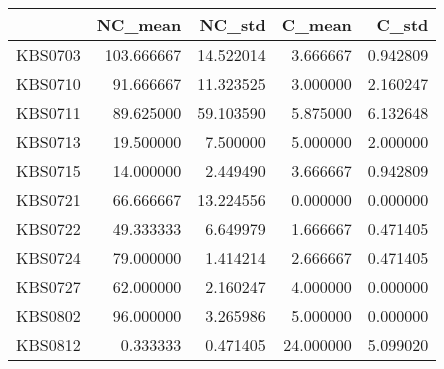 \begin{tabular}{lrrrr}
\toprule
{} &     NC\_mean &     NC\_std &     C\_mean &     C\_std \\
\midrule
KBS0703 &  103.666667 &  14.522014 &   3.666667 &  0.942809 \\
KBS0710 &   91.666667 &  11.323525 &   3.000000 &  2.160247 \\
KBS0711 &   89.625000 &  59.103590 &   5.875000 &  6.132648 \\
KBS0713 &   19.500000 &   7.500000 &   5.000000 &  2.000000 \\
KBS0715 &   14.000000 &   2.449490 &   3.666667 &  0.942809 \\
KBS0721 &   66.666667 &  13.224556 &   0.000000 &  0.000000 \\
KBS0722 &   49.333333 &   6.649979 &   1.666667 &  0.471405 \\
KBS0724 &   79.000000 &   1.414214 &   2.666667 &  0.471405 \\
KBS0727 &   62.000000 &   2.160247 &   4.000000 &  0.000000 \\
KBS0802 &   96.000000 &   3.265986 &   5.000000 &  0.000000 \\
KBS0812 &    0.333333 &   0.471405 &  24.000000 &  5.099020 \\
\bottomrule
\end{tabular}
